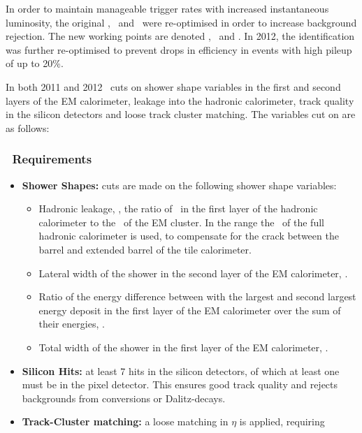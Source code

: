 In order to maintain manageable trigger rates with increased instantaneous
luminosity, the original \loose, \medium\ and \tight\ were re-optimised in order
to increase background rejection. The new working points are denoted \loosePP,
\mediumPP\ and \tightPP. In 2012, the identification was further re-optimised to
prevent drops in efficiency in events with high pileup of up to 20\%. 

In both 2011 and 2012 \loosePP\ cuts on shower shape variables in the first and
second layers of the EM calorimeter, leakage into the hadronic
calorimeter, track quality in the silicon detectors and loose track cluster
matching. The variables cut on are as follows:

\subsubsection{\loosePP\ Requirements}

\begin{itemize}

    \item {\bf Shower Shapes:} cuts are made on the following shower shape
    variables:

    \begin{itemize}
        \item Hadronic leakage, \Rhad, the ratio of \et\ in the first layer of
        the hadronic calorimeter to the \et\ of the EM cluster. In the range
         the \et\ of the full hadronic calorimeter is
        used, to compensate for the crack between the barrel and extended barrel
        of the tile calorimeter.
        \item Lateral width of the shower in the second layer of the EM
        calorimeter, \wetatwo.
        \item Ratio of the energy difference between with the largest and second
        largest energy deposit in the first layer of the EM calorimeter over the
        sum of their energies, \Eratio.
        \item Total width of the shower in the first layer of the EM
        calorimeter, \wstot.
    \end{itemize}

    \item {\bf Silicon Hits:} at least 7 hits in the silicon detectors, of which at
    least one must be in the pixel detector. This ensures good track quality and
    rejects backgrounds from conversions or Dalitz-decays.
    \item {\bf Track-Cluster matching:} a loose matching in $\eta$ is applied,
    requiring 
\end{itemize}

